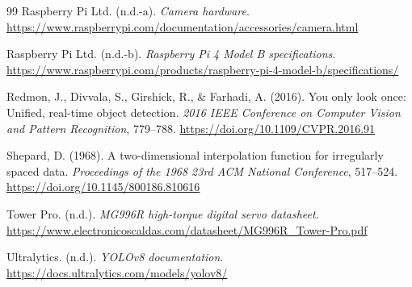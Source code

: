 \documentclass[a4paper,12pt]{report}
\begin{document}
\begin{thebibliography}{99}
Raspberry Pi Ltd. (n.d.-a).
\textit{Camera hardware}.
\url{https://www.raspberrypi.com/documentation/accessories/camera.html}

Raspberry Pi Ltd. (n.d.-b).
\textit{Raspberry Pi 4 Model B specifications}.
\url{https://www.raspberrypi.com/products/raspberry-pi-4-model-b/specifications/}

Redmon, J., Divvala, S., Girshick, R., \& Farhadi, A. (2016).
You only look once: Unified, real-time object detection.
\textit{2016 IEEE Conference on Computer Vision and Pattern Recognition}, 779--788.
\url{https://doi.org/10.1109/CVPR.2016.91}

Shepard, D. (1968).
A two-dimensional interpolation function for irregularly spaced data.
\textit{Proceedings of the 1968 23rd ACM National Conference}, 517--524.
\url{https://doi.org/10.1145/800186.810616}

Tower Pro. (n.d.).
\textit{MG996R high-torque digital servo datasheet}.
\url{https://www.electronicoscaldas.com/datasheet/MG996R_Tower-Pro.pdf}

Ultralytics. (n.d.).
\textit{YOLOv8 documentation}.
\url{https://docs.ultralytics.com/models/yolov8/}

\end{thebibliography}
\end{document}

